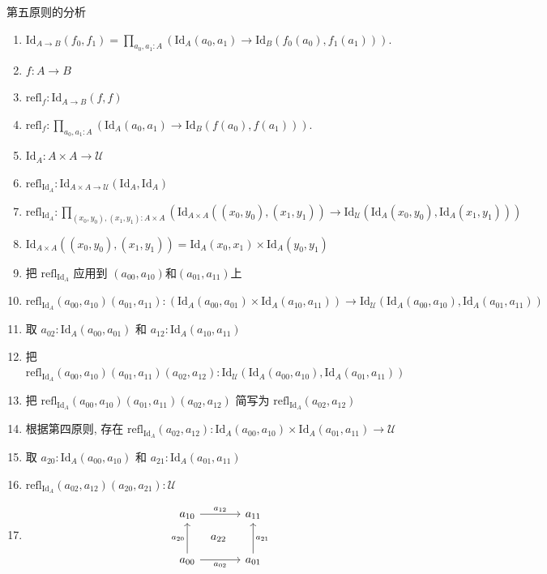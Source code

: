 \documentclass{beamer}
\newcommand{\Id}{\text{Id}}
\newcommand{\refl}{\text{refl}}
\newcommand{\UU}{\mathcal{U}}
\begin{document}
\begin{frame}[fragile]{第五原则的分析}
\begin{enumerate}
  \item $\Id_{A \to B}(f_0, f_1) = \prod_{a_0, a_1 : A} \left( \Id_A(a_0, a_1) \to \Id_B(f_0(a_0), f_1(a_1)) \right).$
  \item $f : A \to B$
  \item $\refl_f : \Id_{A\to B}(f, f)$
  \item $\refl_f : \prod_{a_0, a_1 : A} \left( \Id_A(a_0, a_1) \to \Id_B(f(a_0), f(a_1)) \right).$
  \item $\Id_A : A \times A \to \UU$
  \item $\refl_{\Id_A} : \Id_{A\times A\to\UU}(\Id_A,\Id_A)$
  \item $\refl_{\Id_A} : \prod_{(x_0,y_0),(x_1,y_1):A\times A}(\Id_{A\times A}((x_0,y_0),(x_1,y_1)) \to \Id_{\UU}(\Id_A(x_0,y_0),\Id_A(x_1,y_1)))$
  \item $\Id_{A\times A}((x_0,y_0),(x_1,y_1)) = \Id_A(x_0,x_1)\times\Id_A(y_0,y_1)$
  \item 把 $\refl_{\Id_A}$ 应用到 $(a_{00},a_{10})$和$(a_{01},a_{11})$上
\end{enumerate}
\end{frame}

\begin{frame}[fragile]
  \begin{enumerate}
    \setcounter{enumi}{9}
    \item $\refl_{\Id_A}(a_{00},a_{10})(a_{01},a_{11}) : (\Id_A(a_{00},a_{01})\times\Id_A(a_{10},a_{11}))\to\Id_{\UU}(\Id_A(a_{00},a_{10}),\Id_A(a_{01},a_{11}))$
    \item 取 $a_{02}:\Id_A(a_{00},a_{01})$ 和 $a_{12} : \Id_A(a_{10},a_{11})$
    \item 把 $\refl_{\Id_A}(a_{00},a_{10})(a_{01},a_{11})(a_{02},a_{12}) : \Id_{\UU}(\Id_A(a_{00},a_{10}),\Id_A(a_{01},a_{11}))$
    \item 把 $\refl_{\Id_A}(a_{00},a_{10})(a_{01},a_{11})(a_{02},a_{12})$ 简写为 $\refl_{\Id_A}(a_{02},a_{12})$
    \item 根据第四原则, 存在 $\refl_{\Id_A}(a_{02},a_{12}) : \Id_A(a_{00},a_{10})\times\Id_A(a_{01},a_{11}) \to \UU$
    \item 取 $a_{20} : \Id_A(a_{00},a_{10})$ 和 $a_{21} : \Id_A(a_{01},a_{11})$
    \item $\refl_{\Id_A}(a_{02},a_{12})(a_{20},a_{21}) : \UU$
    \item \[
    \begin{tikzcd}[row sep=large, column sep=large]
a_{10} \arrow[r, "a_{12}"] & a_{11}  \\
a_{00} \arrow[u, "a_{20}"] \arrow[r, "a_{02}"'] \arrow[ur, phantom, "a_{22}"] & a_{01} \arrow[u, "a_{21}"']
\end{tikzcd}
    \]
  \end{enumerate}
\end{frame}
\end{document}
